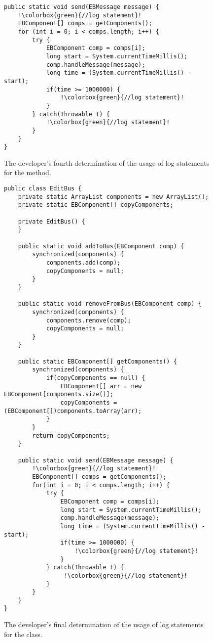 \begin{figure}[p]
\def\baselinestretch{1}
\begin{lstlisting}[escapechar=!]
public static void send(EBMessage message) {
    !\colorbox{green}{//log statement}!
    EBComponent[] comps = getComponents();
    for (int i = 0; i < comps.length; i++) {
        try {
            EBComponent comp = comps[i];
            long start = System.currentTimeMillis();
            comp.handleMessage(message);
            long time = (System.currentTimeMillis() - start);
            if(time >= 1000000) {
                !\colorbox{green}{//log statement}!
            }
        } catch(Throwable t) {
            !\colorbox{green}{//log statement}!
        }
    }
}
\end{lstlisting}
\caption[The developer's fourth determination of the usage of log statements.]{The developer's fourth determination of the usage of log statements for the  method.\label{ch2-ex-logged-m4}}
\end{figure}

\begin{figure}[p]
\def\baselinestretch{0.94}
\begin{lstlisting}[escapechar=!]
public class EditBus {
    private static ArrayList components = new ArrayList();
    private static EBComponent[] copyComponents;

    private EditBus() {
    }

    public static void addToBus(EBComponent comp) {
        synchronized(components) {
            components.add(comp);
            copyComponents = null;
        }
    }

    public static void removeFromBus(EBComponent comp) {
        synchronized(components) {
            components.remove(comp);
            copyComponents = null;
        }
    }

    public static EBComponent[] getComponents() {
        synchronized(components) {
            if(copyComponents == null) {
                EBComponent[] arr = new EBComponent[components.size()];
                copyComponents = (EBComponent[])components.toArray(arr);
            }
        }
        return copyComponents;
    }

    public static void send(EBMessage message) {
        !\colorbox{green}{//log statement}!
        EBComponent[] comps = getComponents();
        for(int i = 0; i < comps.length; i++) {
            try {
                EBComponent comp = comps[i];
                long start = System.currentTimeMillis();
                comp.handleMessage(message);
                long time = (System.currentTimeMillis() - start);
                if(time >= 1000000) {
                    !\colorbox{green}{//log statement}!
                }
            } catch(Throwable t) {
                 !\colorbox{green}{//log statement}!
            }
        }
    }
}
\end{lstlisting}

\caption[The developer's final determination of the usage of log statements.]{The developer's final determination of the usage of log statements for the  class.\label{ch2-ex-logged}}
\end{figure}

